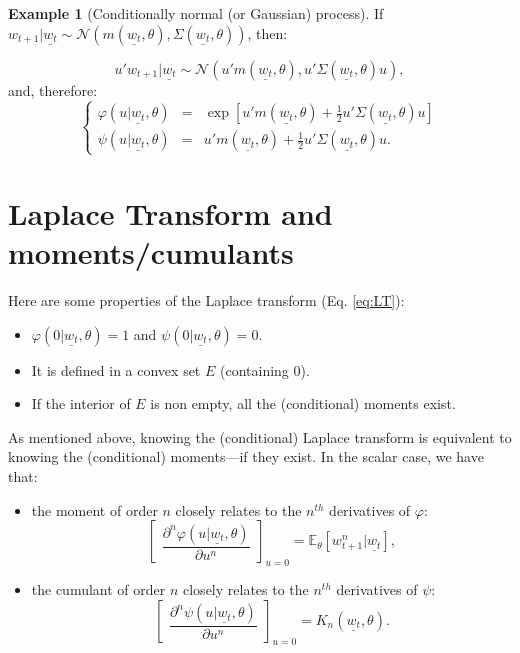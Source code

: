 \documentclass[
  12pt,
]{book}
\providecommand{\tightlist}{%
  \setlength{\itemsep}{0pt}\setlength{\parskip}{0pt}}
\theoremstyle{definition}
\theoremstyle{definition}
\newtheorem{example}{Example}[chapter]
\theoremstyle{definition}
\theoremstyle{definition}
\theoremstyle{remark}
\begin{document}
\begin{example}[Conditionally normal (or Gaussian) process]
\protect\hypertarget{exm:exGaussian}{}\label{exm:exGaussian}If \(w_{t+1}|\underline{w_t} \sim \mathcal{N}\left(m(\underline{w_t},\theta), \Sigma(\underline{w_t},\theta)\right)\), then:

\[
u'w_{t+1}|\underline{w_t} \sim \mathcal{N}\left(u'm(\underline{w_t},\theta), u'\Sigma(\underline{w_t},\theta)u\right),
\]
and, therefore:
\[
\left\{
\begin{array}{ccc}
\varphi(u|\underline{w_t},\theta) &=& \exp\left[u'm(\underline{w_t},\theta)+
\frac{1}{2} u'\Sigma(\underline{w_t},\theta)u\right]\\
\psi(u|\underline{w_t},\theta) &=&
u'm(\underline{w_t},\theta) +  \frac{1}{2}
u'\Sigma(\underline{w_t},\theta)u.
\end{array}
\right.
\]
\end{example}

\hypertarget{AffineLaplace}{%
\section{Laplace Transform and moments/cumulants}\label{AffineLaplace}}

Here are some properties of the Laplace transform (Eq. \eqref{eq:LT}):

\begin{itemize}
\tightlist
\item
  \(\varphi(0|\underline{w_t},\theta) = 1\) and \(\psi(0|\underline{w_t},\theta)=0\).
\item
  It is defined in a convex set \(E\) (containing \(0\)).
\item
  If the interior of \(E\) is non empty, all the (conditional) moments exist.
\end{itemize}

As mentioned above, knowing the (conditional) Laplace transform is equivalent to knowing the (conditional) moments---if they exist. In the scalar case, we have that:

\begin{itemize}
\tightlist
\item
  the moment of order \(n\) closely relates to the \(n^{th}\) derivatives of \(\varphi\):
  \[
  \left[ \begin{array}{l}  \dfrac{\partial^n
  \varphi(u|\underline{w_t},\theta)}{\partial u^n}
  \end{array} \right]_{u=0} = \mathbb{E}_{\theta}[w^n_{t+1}|\underline{w_t}],
  \]
\item
  the cumulant of order \(n\) closely relates to the \(n^{th}\) derivatives of \(\psi\):
  \[
  \left[ \begin{array}{l}  \dfrac{\partial^n
  \psi(u|\underline{w_t},\theta)}{\partial u^n}
  \end{array} \right]_{u=0} = K_n(\underline{w_t},\theta).
  \]
\end{itemize}
\end{document}
